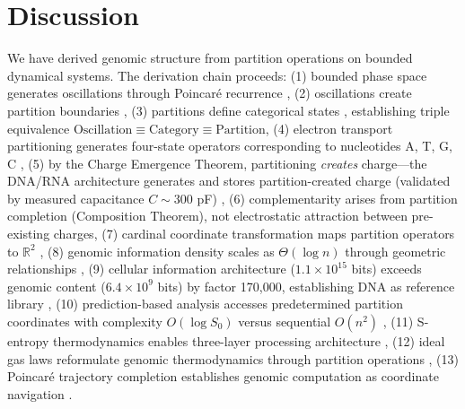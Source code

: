 \documentclass[11pt,a4paper]{article}
\theoremstyle{remark}
\begin{document}
\section{Discussion}

We have derived genomic structure from partition operations on bounded dynamical systems. The derivation chain proceeds: (1) bounded phase space generates oscillations through Poincaré recurrence \citep{poincare1890probleme, birkhoff1931proof}, (2) oscillations create partition boundaries \citep{arnold1978mathematical}, (3) partitions define categorical states \citep{kolmogorov1957theory}, establishing triple equivalence $\text{Oscillation} \equiv \text{Category} \equiv \text{Partition}$, (4) electron transport partitioning generates four-state operators corresponding to nucleotides A, T, G, C \citep{mitchell1961coupling, nicholls2013bioenergetics}, (5) by the Charge Emergence Theorem, partitioning \emph{creates} charge---the DNA/RNA architecture generates and stores partition-created charge (validated by measured capacitance $C \sim 300$ pF) \citep{watson1953molecular, bloomfield1997dna, Sachikonye2025_Partition}, (6) complementarity arises from partition completion (Composition Theorem), not electrostatic attraction between pre-existing charges, (7) cardinal coordinate transformation maps partition operators to $\mathbb{R}^2$ \citep{nandy2006graphical, yau2003dna}, (8) genomic information density scales as $\Theta(\log n)$ through geometric relationships \citep{shannon1948mathematical, schneider1986information}, (9) cellular information architecture ($1.1 \times 10^{15}$ bits) exceeds genomic content ($6.4 \times 10^9$ bits) by factor 170,000, establishing DNA as reference library \citep{elowitz2002stochastic, larsson2019genomic}, (10) prediction-based analysis accesses predetermined partition coordinates with complexity $O(\log S_0)$ versus sequential $O(n^2)$ \citep{altschul1990basic, landauer1961irreversibility}, (11) S-entropy thermodynamics enables three-layer processing architecture \citep{callen1985thermodynamics, jarzynski1997nonequilibrium}, (12) ideal gas laws reformulate genomic thermodynamics through partition operations \citep{reif1965fundamentals}, (13) Poincaré trajectory completion establishes genomic computation as coordinate navigation \citep{poincare1890probleme}.
\end{document}
